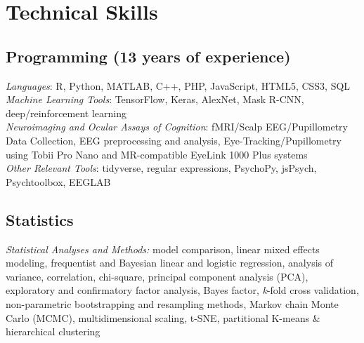 \section*{Technical Skills}
\subsection*{Programming (13 years of experience)}
\textit{Languages}: R, Python, MATLAB, C++, PHP, JavaScript, HTML5, CSS3, SQL\\
\textit{Machine Learning Tools}: TensorFlow, Keras, AlexNet, Mask R-CNN, deep/reinforcement learning\\
\textit{Neuroimaging and Ocular Assays of Cognition}: fMRI/Scalp EEG/Pupillometry Data Collection, EEG preprocessing and analysis, Eye-Tracking/Pupillometry using Tobii Pro Nano and MR-compatible EyeLink 1000 Plus systems\\
\textit{Other Relevant Tools}: tidyverse, regular expressions, PsychoPy, jsPsych, Psychtoolbox, EEGLAB

\subsection*{Statistics}
\textit{Statistical Analyses and Methods:} model comparison, linear mixed effects modeling, frequentist and Bayesian linear and logistic regression, analysis of variance, correlation, chi-square, principal component analysis (PCA), exploratory and confirmatory factor analysis, Bayes factor, \textit{k}-fold cross validation, non-parametric bootstrapping and resampling methods, Markov chain Monte Carlo (MCMC),  multidimensional scaling, t-SNE, partitional K-means \& hierarchical clustering